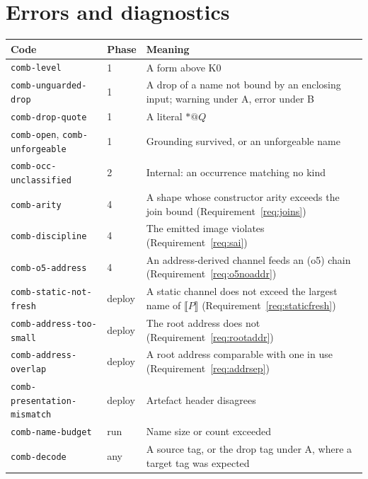 \documentclass[11pt,a4paper]{article}
\makeatletter
\newcommand{\code}[1]{\texttt{#1}}
\newcommand{\quo}[1]{@#1}
\newcommand{\drp}[1]{{*}#1}
\newcommand{\enc}[1]{\llbracket #1 \rrbracket}
\theoremstyle{definition}
\theoremstyle{plain}
\makeatother
\begin{document}
\section{Errors and diagnostics}\label{sec:errors}

\begin{center}
\begin{tabularx}{\linewidth}{@{}ll>{\raggedright\arraybackslash}X@{}}
\toprule
Code & Phase & Meaning\\
\midrule
\code{comb-level} & 1 & A form above K0\\
\code{comb-unguarded-drop} & 1 & A drop of a name not bound by an enclosing
input; warning under A, error under B\\
\code{comb-drop-quote} & 1 & A literal $\drp{\quo{Q}}$\\
\code{comb-open}, \code{comb-unforgeable} & 1 & Grounding survived, or an
unforgeable name\\
\code{comb-occ-unclassified} & 2 & Internal: an occurrence matching no kind\\
\code{comb-arity} & 4 & A shape whose constructor arity exceeds the join bound
(Requirement~\ref{req:joins})\\
\code{comb-discipline} & 4 & The emitted image violates
\cite[Def.~6.10]{draft3} (Requirement~\ref{req:sai})\\
\code{comb-o5-address} & 4 & An address-derived channel feeds an (o5) chain
(Requirement~\ref{req:o5noaddr})\\
\code{comb-static-not-fresh} & deploy & A static channel does not exceed the
largest name of $\enc{P}$ (Requirement~\ref{req:staticfresh})\\
\code{comb-address-too-small} & deploy & The root address does not
(Requirement~\ref{req:rootaddr})\\
\code{comb-address-overlap} & deploy & A root address comparable with one in
use (Requirement~\ref{req:addrsep})\\
\code{comb-presentation-mismatch} & deploy & Artefact header disagrees\\
\code{comb-name-budget} & run & Name size or count exceeded\\
\code{comb-decode} & any & A source tag, or the drop tag under A, where a
target tag was expected\\
\bottomrule
\end{tabularx}
\end{center}
\end{document}
